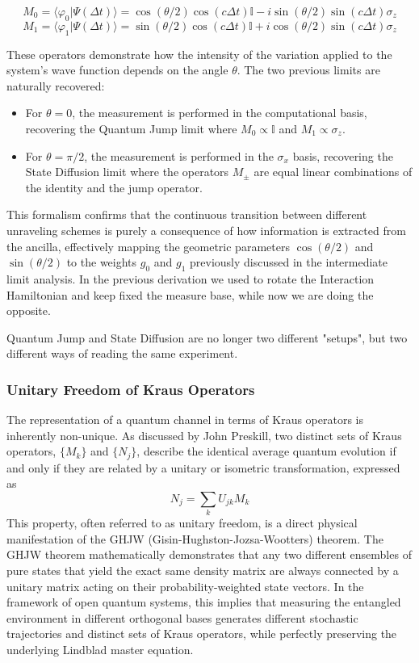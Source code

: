 \documentclass[a4paper,12pt]{article}
\begin{document}
\begin{equation}
	M_0 = \langle \varphi_0 | \Psi(\Delta t) \rangle = \cos(\theta/2) \cos(c\Delta t) \mathbb{I} - i \sin(\theta/2) \sin(c\Delta t) \sigma_z
\end{equation}
\begin{equation}
	M_1 = \langle \varphi_1 | \Psi(\Delta t) \rangle = \sin(\theta/2) \cos(c\Delta t) \mathbb{I} + i \cos(\theta/2) \sin(c\Delta t) \sigma_z
\end{equation}

These operators demonstrate how the intensity of the variation applied to the system's wave function depends on the angle $\theta$. The two previous limits are naturally recovered:
\begin{itemize}
	\item For $\theta = 0$, the measurement is performed in the computational basis, recovering the Quantum Jump limit where $M_0 \propto \mathbb{I}$ and $M_1 \propto \sigma_z$.
	\item For $\theta = \pi/2$, the measurement is performed in the $\sigma_x$ basis, recovering the State Diffusion limit where the operators $M_{\pm}$ are equal linear combinations of the identity and the jump operator.
\end{itemize}
This formalism confirms that the continuous transition between different unraveling schemes is purely a consequence of how information is extracted from the ancilla, effectively mapping the geometric parameters $\cos(\theta/2)$ and $\sin(\theta/2)$ to the weights $g_0$ and $g_1$ previously discussed in the intermediate limit analysis. In the previous derivation we used to  rotate the Interaction Hamiltonian and keep fixed the measure base, while now we are doing the opposite.

Quantum Jump and State Diffusion are no longer two different "setups", but two different ways of reading the same experiment.

\subsubsection{Unitary Freedom of Kraus Operators}
The representation of a quantum channel in terms of Kraus operators is inherently non-unique. As discussed by John Preskill\cite{preskill2015lecture}, two distinct sets of Kraus operators, $\{M_k\}$ and $\{N_j\}$, describe the identical average quantum evolution if and only if they are related by a unitary or isometric transformation, expressed as 
\begin{equation}
	N_j = \sum_k U_{jk} M_k
\end{equation}
This property, often referred to as unitary freedom, is a direct physical manifestation of the GHJW (Gisin-Hughston-Jozsa-Wootters) theorem. The GHJW theorem mathematically demonstrates that any two different ensembles of pure states that yield the exact same density matrix are always connected by a unitary matrix acting on their probability-weighted state vectors. In the framework of open quantum systems, this implies that measuring the entangled environment in different orthogonal bases generates different stochastic trajectories and distinct sets of Kraus operators, while perfectly preserving the underlying Lindblad master equation.
\end{document}
